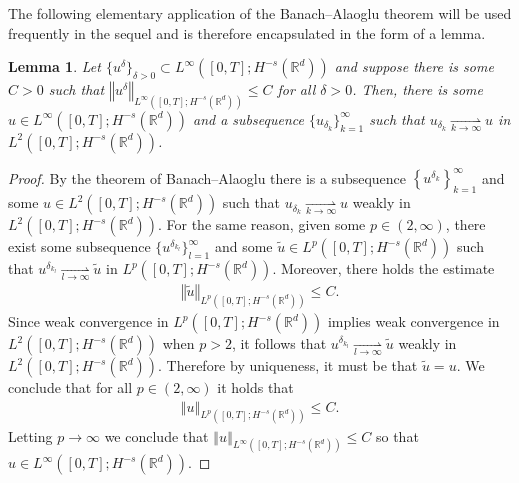 \documentclass[11pt,reqno]{amsart}
\newtheorem{lem}[thm]{Lemma}
\numberwithin{equation}{section}
\begin{document}
The following elementary application of the Banach--Alaoglu theorem will be used frequently in the sequel and is therefore encapsulated in the form of a lemma. 
\begin{lem} \label{BanachAl Lemma}
Let $\{u^{\delta}\}_{\delta>0}\subset L^{\infty}([0,T];H^{-s}(\mathbb{R}^{d}))$ and suppose there is some $C>0$ such that $\left\Vert u^{\delta}\right\Vert_{L^{\infty}([0,T];H^{-s}(\mathbb{R}^{d}))} \leq C$ for all $\delta>0$. Then, there is some $u\in L^{\infty}([0,T];H^{-s}(\mathbb{R}^{d}))$ and a subsequence $\{u_{\delta_{k}}\}_{k=1}^{\infty}$ such that $u_{\delta_{k}}\underset{k\rightarrow \infty}{\rightharpoonup}u$ in $L^{2}([0,T];H^{-s}(\mathbb{R}^{d}))$.   
\end{lem}
\begin{proof}
By the theorem of Banach--Alaoglu there is a subsequence $\left\{u^{\delta_{{k}}}\right\}_{k=1}^{\infty}$ and some $u\in L^{2}([0,T];H^{-s}(\mathbb{R}^{d}))$ such that $u_{\delta_{k}}\underset{k\rightarrow \infty}{\rightharpoonup} u$ weakly in $L^{2}([0,T];H^{-s}(\mathbb{R}^{d}))$. 
For the same reason, given some $p\in (2,\infty)$, there exist some subsequence $\{u^{\delta_{k_{l}}}\}_{l=1}^{\infty}$ and some $\widetilde{u}\in L^{p}([0,T];H^{-s}(\mathbb{R}^{d}))$ such that $u^{\delta_{k_{l}}}\underset{l\rightarrow \infty}{\rightharpoonup}\widetilde{u}$ in $L^{p}([0,T];H^{-s}(\mathbb{R}^{d}))$. Moreover, there holds the estimate 
\begin{align*}
\left\Vert \widetilde{u}\right\Vert_{L^{p}([0,T];H^{-s}(\mathbb{R}^{d}))}\leq C.      
\end{align*}
Since weak convergence in $L^{p}([0,T];H^{-s}(\mathbb{R}^{d}))$ implies weak convergence in $L^{2}([0,T];H^{-s}(\mathbb{R}^{d}))$ when $p>2$, it follows that $u^{\delta_{k_{l}}}\underset{l\rightarrow \infty}{\rightharpoonup} \widetilde{u}$ weakly in $L^{2}([0,T];H^{-s}(\mathbb{R}^{d}))$. Therefore by uniqueness, it must be that $\widetilde{u}=u$. We conclude that for all $p\in (2,\infty)$ it holds that 
\begin{align*}
\left\Vert u\right\Vert_{L^{p}([0,T];H^{-s}(\mathbb{R}^{d}))}\leq C.      
\end{align*}
Letting $p\rightarrow
 \infty$ we conclude that $\left\Vert u\right\Vert_{L^{\infty}([0,T];H^{-s}(\mathbb{R}^{d}))}\leq C$ so that $u\in L^{\infty}([0,T];H^{-s}(\mathbb{R}^{d}))$. 
\end{proof}
\end{document}
